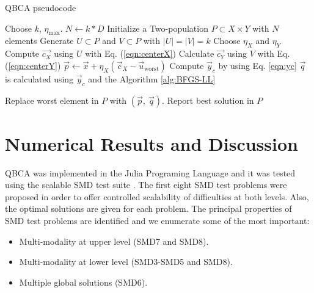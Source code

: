 \documentclass[conference]{IEEEtran}
\theoremstyle{definition}
\begin{document}
\begin{algorithm}[htbp]
    \caption{QBCA pseudocode}
    \label{alg:QBCA}
    \begin{algorithmic}[1]
        \STATE Choose $k$, $\eta_{\max}$.
        \STATE $N \gets k * D$
        \STATE Initialize a Two-population $P\subset X\times Y$ with $N$ elements
                \STATE Generate $U \subset P$ and $V \subset P$ with $|U| = |V| = k$
                \STATE Choose $\eta_{X}$ and $\eta_{Y}$
                \STATE Compute $\vec{c_X}$ using $U$ with Eq. (\ref{eqn:centerX})
                \STATE Calculate $\vec{c_Y}$ using $V$ with Eq. (\ref{eqn:centerY})
                \STATE $ \vec{p} \gets \vec{x} + \eta_{X} (\vec{c}_X - \vec{u}_{\text{worst}})$
                \STATE Compute $ \vec{y}_c $ by using Eq. \ref{eqn:yc}
                \STATE $ \vec{q} $ is calculated using $\vec{y}_c$ and the Algorithm \ref{alg:BFGS-LL}
                
                    \STATE Replace worst element in $P$ with $(\vec{p},\ \vec{q})$.
                \ENDIF
            \ENDFOR
        \ENDWHILE
        \STATE Report best solution in $P$
    \end{algorithmic}
\end{algorithm}

\section{Numerical Results and Discussion} %
\label{sec:numerical_result}

QBCA was implemented in the Julia Programing Language \cite{bezanson2017julia}
and it was tested using the scalable SMD test suite
\cite{sinha2014test,sinha2013efficient}. The first eight SMD test problems were
proposed in order to offer controlled scalability of difficulties at both levels.
Also, the optimal solutions are given for each problem. The principal properties
of SMD test problems are identified and we enumerate some of the most important:

\begin{itemize}
    \item Multi-modality at upper level (SMD7 and SMD8).
    \item Multi-modality at lower level (SMD3-SMD5 and SMD8).
    \item Multiple global solutions (SMD6).
\end{itemize}
\end{document}

